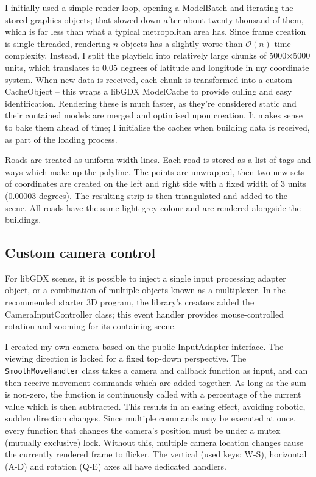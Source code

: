I initially used a simple render loop, opening a ModelBatch and iterating the stored graphics objects; that slowed down after about twenty thousand of them, which is far less than what a typical metropolitan area has. Since frame creation is single-threaded, rendering $n$ objects has a slightly worse than $\mathcal{O}(n)$ time complexity. Instead, I split the playfield into relatively large chunks of 5000$\times$5000 units, which translates to 0.05 degrees of latitude and longitude in my coordinate system. When new data is received, each chunk is transformed into a custom CacheObject -- this wraps a libGDX ModelCache to provide culling and easy identification. Rendering these is much faster, as they're considered static and their contained models are merged and optimised upon creation.\cite{LibgdxModelCache} It makes sense to bake them ahead of time; I initialise the caches when building data is received, as part of the loading process.

Roads are treated as uniform-width lines. Each road is stored as a list of tags and ways which make up the polyline. The points are unwrapped, then two new sets of coordinates are created on the left and right side with a fixed width of 3 units (0.00003 degrees). The resulting strip is then triangulated and added to the scene. All roads have the same light grey colour and are rendered alongside the buildings.

\subsection{Custom camera control}

For libGDX scenes, it is possible to inject a single input processing adapter object, or a combination of multiple objects known as a multiplexer. In the recommended starter 3D program\cite{basic3DlibGDX}, the library's creators added the CameraInputController class; this event handler provides mouse-controlled rotation and zooming for its containing scene.

I created my own camera based on the public InputAdapter interface. The viewing direction is locked for a fixed top-down perspective. The \verb|SmoothMoveHandler| class takes a camera and callback function as input, and can then receive movement commands which are added together. As long as the sum is non-zero, the function is continuously called with a percentage of the current value which is then subtracted. This results in an easing effect, avoiding robotic, sudden direction changes. Since multiple commands may be executed at once, every function that changes the camera's position must be under a mutex (mutually exclusive) lock. Without this, multiple camera location changes cause the currently rendered frame to flicker. The vertical (used keys: W-S), horizontal (A-D) and rotation (Q-E) axes all have dedicated handlers.

